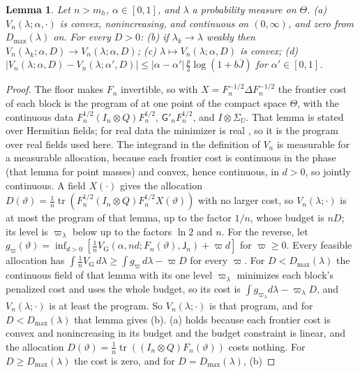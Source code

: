 \documentclass[11pt,onecolumn]{IEEEtran}
\newtheorem{lemma}[theorem]{Lemma}
\newcommand{\tr}{\operatorname{tr}}
\newcommand{\VG}{V_{\mathrm G}}
\begin{document}
\begin{lemma}\label{lem:frozen}
Let $n>m_h$, $\alpha\in[0,1]$, and $\lambda$ a probability measure on
$\Theta$. (a) $V_n(\lambda;\alpha,\cdot)$ is convex, nonincreasing, and
continuous on $(0,\infty)$, and zero from $D_{\max}(\lambda)$ on. For every
$D>0$: (b) if $\lambda_k\to\lambda$ weakly then
$V_n(\lambda_k;\alpha,D)\to V_n(\lambda;\alpha,D)$; (c) $\lambda\mapsto V_n(\lambda;\alpha,D)$
is convex; (d) $|V_n(\lambda;\alpha,D)-V_n(\lambda;\alpha',D)|\le|\alpha-\alpha'|\,\tfrac p2\log(1+b\bar J)$
for $\alpha'\in[0,1]$.
\end{lemma}

\begin{proof}
The floor makes $F_n$ invertible, so with $X=F_n^{-1/2}\Delta F_n^{-1/2}$
the frontier cost of each block is the program of \cite[Lemma~2]{part2}
at one point of the compact space $\Theta$, with the continuous data
$F_n^{1/2}(I_n\otimes Q)F_n^{1/2}$, $\mathsf G'_nF_n^{1/2}$, and
$I\otimes\Sigma_U$. That lemma is stated over Hermitian fields; for real
data the minimizer is real \cite[Lemma~1]{part2}, so it is the program
over real fields used here. The integrand in the definition of $V_n$ is
measurable for a measurable allocation, because each frontier cost is
continuous in the phase (that lemma for point masses) and convex, hence
continuous, in $d>0$, so jointly continuous. A field $X(\cdot)$ gives the
allocation
$D(\vartheta)=\tfrac1n\tr(F_n^{1/2}(I_n\otimes Q)F_n^{1/2}X(\vartheta))$ with no
larger cost, so $V_n(\lambda;\cdot)$ is at most the program of that lemma,
up to the factor $1/n$, whose budget is $nD$; its level is $\varpi_\lambda$
below up to the factors $\ln2$ and $n$. For the reverse, let
$g_\varpi(\vartheta)=\inf_{d>0}[\tfrac1n\VG(\alpha,nd;F_n(\vartheta),\mathsf J_n)+\varpi d]$
for $\varpi\ge0$. Every feasible allocation has
$\int\tfrac1n\VG\,d\lambda\ge\int g_\varpi\,d\lambda-\varpi D$ for every $\varpi$.
For $D<D_{\max}(\lambda)$ the continuous field of that lemma with its one
level $\varpi_\lambda$ minimizes each block's penalized cost and uses the
whole budget, so its cost is $\int g_{\varpi_\lambda}d\lambda-\varpi_\lambda D$, and
$V_n(\lambda;\cdot)$ is at least the program. So $V_n(\lambda;\cdot)$ is that
program, and for $D<D_{\max}(\lambda)$ that lemma gives (b). (a) holds
because each frontier cost is convex and nonincreasing in its budget
and the budget constraint is linear, and the allocation
$D(\vartheta)=\tfrac1n\tr((I_n\otimes Q)F_n(\vartheta))$ costs nothing. For
$D\ge D_{\max}(\lambda)$ the cost is zero, and for $D=D_{\max}(\lambda)$, (b)

\end{proof}
\end{document}
